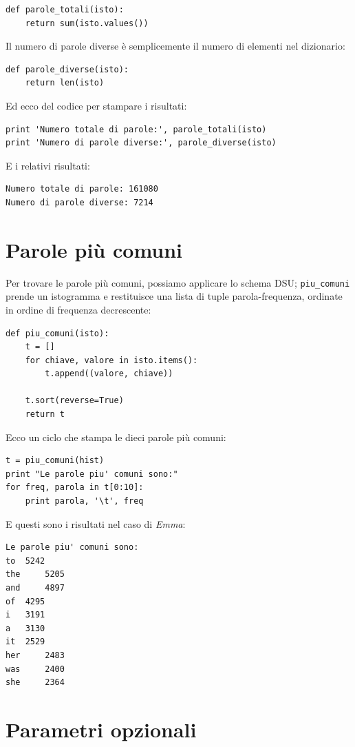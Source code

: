 \documentclass[10pt]{book}
\begin{document}
\begin{verbatim}
def parole_totali(isto):
    return sum(isto.values())
\end{verbatim}
%
Il numero di parole diverse è semplicemente il numero di elementi nel dizionario:

\begin{verbatim}
def parole_diverse(isto):
    return len(isto)
\end{verbatim}
%
Ed ecco del codice per stampare i risultati:

\begin{verbatim}
print 'Numero totale di parole:', parole_totali(isto)
print 'Numero di parole diverse:', parole_diverse(isto)
\end{verbatim}
%
E i relativi risultati:

\begin{verbatim}
Numero totale di parole: 161080
Numero di parole diverse: 7214
\end{verbatim}
%

\section{Parole più comuni}

Per trovare le parole più comuni, possiamo applicare lo schema DSU;
\verb"piu_comuni" prende un istogramma e restituisce una lista di tuple parola-frequenza, ordinate in ordine di frequenza decrescente:

\begin{verbatim}
def piu_comuni(isto):
    t = []
    for chiave, valore in isto.items():
        t.append((valore, chiave))

    t.sort(reverse=True)
    return t
\end{verbatim}
%
Ecco un ciclo che stampa le dieci parole più comuni:

\begin{verbatim}
t = piu_comuni(hist)
print "Le parole piu' comuni sono:"
for freq, parola in t[0:10]:
    print parola, '\t', freq
\end{verbatim}
%
E questi sono i risultati nel caso di {\em Emma}:

\begin{verbatim}
Le parole piu' comuni sono:
to 	5242
the 	5205
and 	4897
of 	4295
i 	3191
a 	3130
it 	2529
her 	2483
was 	2400
she 	2364
\end{verbatim}
%

\section{Parametri opzionali}
\end{document}
